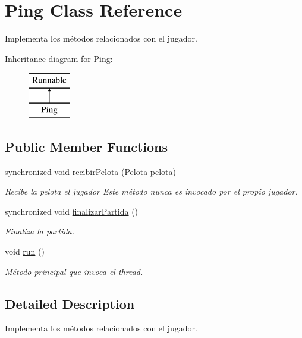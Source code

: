 \hypertarget{classPing}{\section{Ping Class Reference}
\label{classPing}
}


Implementa los métodos relacionados con el jugador.  


Inheritance diagram for Ping\-:\begin{figure}[H]
\begin{center}
\leavevmode
\includegraphics[height=2.000000cm]{classPing}
\end{center}
\end{figure}
\subsection*{Public Member Functions}
\begin{DoxyCompactItemize}
\item 
synchronized void \hyperlink{classPing_ade3b67ac253641d42d9a2057cfea7fe0}{recibir\-Pelota} (\hyperlink{classPelota}{Pelota} pelota)
\begin{DoxyCompactList}\small\item\em Recibe la pelota el jugador Este método nunca es invocado por el propio jugador. \end{DoxyCompactList}\item 
synchronized void \hyperlink{classPing_a6952252bb87045ab55691a79b53b5fe0}{finalizar\-Partida} ()
\begin{DoxyCompactList}\small\item\em Finaliza la partida. \end{DoxyCompactList}\item 
void \hyperlink{classPing_ad8528b6dfdff62253861d4881ecd2c43}{run} ()
\begin{DoxyCompactList}\small\item\em Método principal que invoca el thread. \end{DoxyCompactList}\end{DoxyCompactItemize}


\subsection{Detailed Description}
Implementa los métodos relacionados con el jugador. 

